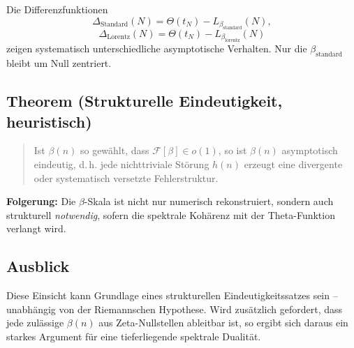 Die Differenzfunktionen
\[
\Delta_{\text{Standard}}(N) = \Theta(t_N) - L_{\beta_{\text{standard}}}(N),
\]
\[
\Delta_{\text{Lorentz}}(N) = \Theta(t_N) - L_{\beta_{\text{lorentz}}}(N)
\]
zeigen systematisch unterschiedliche asymptotische Verhalten. Nur die \(\beta_{\text{standard}}\) bleibt um Null zentriert.

\subsection{Theorem (Strukturelle Eindeutigkeit, heuristisch)}

\begin{quote}
Ist \(\beta(n)\) so gewählt, dass \(\mathcal{F}[\beta] \in o(1)\), so ist \(\beta(n)\) asymptotisch eindeutig, d.\,h. jede nichttriviale Störung \(h(n)\) erzeugt eine divergente oder systematisch versetzte Fehlerstruktur.
\end{quote}

\textbf{Folgerung:} Die \(\beta\)-Skala ist nicht nur numerisch rekonstruiert, sondern auch strukturell \emph{notwendig}, sofern die spektrale Kohärenz mit der Theta-Funktion verlangt wird.

\subsection{Ausblick}

Diese Einsicht kann Grundlage eines strukturellen Eindeutigkeitssatzes sein – unabhängig von der Riemannschen Hypothese. Wird zusätzlich gefordert, dass jede zulässige \(\beta(n)\) aus Zeta-Nullstellen ableitbar ist, so ergibt sich daraus ein starkes Argument für eine tieferliegende spektrale Dualität.